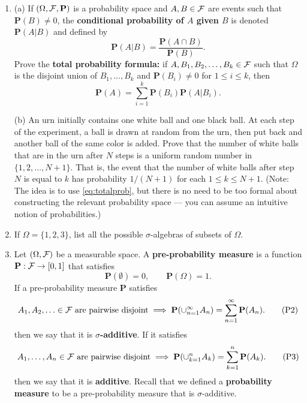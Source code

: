 \documentclass[12pt]{article}
\newcommand{\prob}{\mathbf{P}}
\theoremstyle{example}
\begin{document}
\begin{enumerate}
\item (a) If $(\Omega, {\cal F}, \prob)$ is a probability space and $A, B\in {\cal F}$ are events such that $\prob(B)\neq 0$, the \textbf{conditional probability of $A$ given $B$} is denoted $\prob(A | B)$ and defined by
$$ \prob(A | B) = \frac{\prob(A \cap B)}{\prob(B)}. $$
Prove the \textbf{total probability formula:} if $A,B_1,B_2,\ldots,B_k \in {\cal F}$ such that $\Omega$ is the disjoint union of $B_1,\ldots, B_k$ and $\prob(B_i) \neq 0$ for $1\le i\le k$, then
\begin{equation} \tag{TPF} \prob(A) = \sum_{i=1}^k \prob(B_i) \prob(A | B_i). \label{eq:totalprob} \end{equation}

\medskip\noindent
(b) An urn initially contains one white ball and one black ball. At each step of the experiment, a ball is drawn at random from the urn, then put back and another ball of the same color is added. Prove that the number of white balls that are in the urn after $N$ steps is a uniform random number in $\{1,2,\ldots,N+1\}$. That is, the event that the number of white balls after step $N$ is equal to $k$ has probability $1/(N+1)$ for each $1\le k\le N+1$.
(Note: The idea is to use \eqref{eq:totalprob}, but there is no need to be too formal about constructing the relevant probability space --- you can assume an intuitive notion of probabilities.)

\item If $\Omega=\{1,2,3\}$, list all the possible $\sigma$-algebras of subsets of $\Omega$.


\item Let $(\Omega, {\cal F})$ be a measurable space. A \textbf{pre-probability measure} is a function $\prob:{\cal F}\to [0,1]$ that satisfies
\begin{equation} \tag{P1} \prob(\emptyset) = 0, \qquad \prob(\Omega) = 1. \label{eq:P1} \end{equation}
If a pre-probability measure $\prob$ satisfies
\begin{equation}
A_1, A_2, \ldots \in {\cal F}\textrm{ are pairwise disjoint} \implies
\prob(\cup_{n=1}^\infty A_n) = \sum_{n=1}^\infty \prob(A_n).
\tag{P2} \label{eq:P2}
\end{equation}
then we say that it is \textbf{$\sigma$-additive}. If it satisfies
\begin{equation}
A_1,\ldots ,A_n \in {\cal F}\textrm{ are pairwise disjoint} \implies
\prob(\cup_{k=1}^n A_k) = \sum_{k=1}^n \prob(A_k).
\tag{P3} \label{eq:P3}
\end{equation}
then we say that it is \textbf{additive}. Recall that we defined a \textbf{probability measure} to be a pre-probability measure that is $\sigma$-additive.


\end{enumerate}
\end{document}
